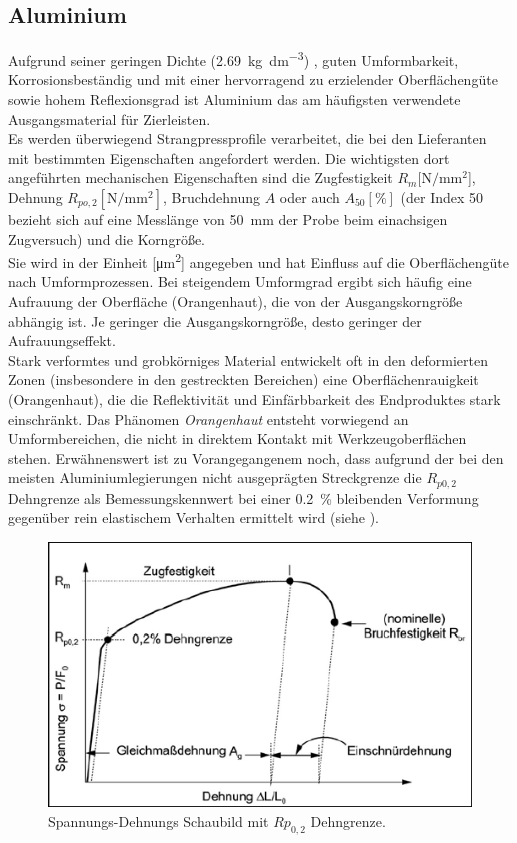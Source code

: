 \documentclass[12pt,a4paper,parskip,twoside,BCOR5mm,headsepline]{scrartcl}
\begin{document}
\subsection{Aluminium}
Aufgrund seiner geringen Dichte (\SI{2.69}{\kilo\gram\per\deci\meter\cubed}) \autocite[353]{wm}, guten Umformbarkeit, Korrosionsbeständig und mit einer hervorragend zu erzielender Oberflächengüte sowie hohem Reflexionsgrad ist Aluminium das am häufigsten verwendete Ausgangsmaterial für Zierleisten.\\
 Es werden überwiegend Strangpressprofile verarbeitet, die bei den Lieferanten mit bestimmten Eigenschaften angefordert werden. Die wichtigsten dort angeführten mechanischen Eigenschaften sind die Zugfestigkeit $R_m  [\si{\newton\per\milli\meter\squared}$], Dehnung $R_{po,2} [\si{\newton\per\milli\meter\squared}]$,   Bruchdehnung $A$ oder auch $A_{50} [\si{\percent}]$ (der Index 50 bezieht sich auf eine Messlänge  von \SI{50}{\milli\meter} der Probe  beim einachsigen Zugversuch) \autocite[281]{aa} und die Korngröße.\\
  Sie wird in der Einheit [\si{\micro\meter\squared}] angegeben und hat Einfluss auf die Oberflächengüte nach  Umformprozessen. Bei steigendem Umformgrad ergibt sich häufig eine Aufrauung der Oberfläche (Orangenhaut)\label{sec:orangenhaut}, die von der Ausgangskorngröße abhängig ist. Je geringer die Ausgangskorngröße, desto geringer der Aufrauungseffekt. \autocite[524]{aa}\\ Stark verformtes und grobkörniges Material entwickelt oft in den deformierten Zonen (insbesondere in den gestreckten Bereichen) eine Oberflächenrauigkeit (Orangenhaut), die die Reflektivität und Einfärbbarkeit des Endproduktes stark einschränkt. Das Phänomen \emph{Orangenhaut} entsteht vorwiegend an Umformbereichen, die nicht in direktem Kontakt mit Werkzeugoberflächen stehen.\autocite[19]{hmp}
Erwähnenswert ist zu Vorangegangenem noch, dass aufgrund der bei den meisten Aluminiumlegierungen nicht ausgeprägten Streckgrenze  die $R_{p0,2}$ Dehngrenze als Bemessungskennwert bei einer \SI{0.2}{\percent} bleibenden Verformung gegenüber rein elastischem Verhalten ermittelt wird (siehe ).
\begin{figure}[hbtp]
\centering
 	\includegraphics[width=.8\textwidth]{spanndehn2}
 	\caption[Spannungs-Dehnungs Schaubild]{Spannungs-Dehnungs Schaubild mit $Rp_{0,2} $ Dehngrenze. \autocite[280-281]{aa}}
 	\label{fig:spanndehn2}
 	\end{figure}
 	
\end{document}
